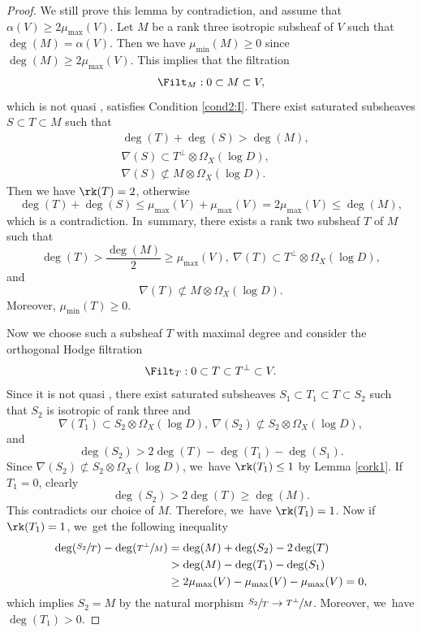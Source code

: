 \begin{proof}
We still prove this lemma by contradiction, and assume that $\alpha(V)\geq2\mu_{\max}(V)$. Let $M$ be a rank three isotropic subsheaf of $V$ such that $\deg(M)=\alpha(V)$. Then we have $\mu_{\min}(M)\geq0$ since $\deg(M)\geq 2\mu_{\max}(V)$. This implies that the filtration
\[
\Filt_{M}:0\subset M\subset V,
\]
which is not quasi \grsemistable, satisfies Condition \eqref{cond2:I}. There exist saturated subsheaves $S\subset T\subset M$ such that
\begin{align*}
& \deg(T)+\deg(S)>\deg(M), \\
& \nabla(S)\subset T^\perp\otimes\Omega_X(\log D), \\
& \nabla(S)\not\subset M\otimes\Omega_X(\log D).
\end{align*}
Then we have $\rk(T)=2$, otherwise
\[
\deg(T)+\deg(S)\leq \mu_{\max}(V)+\mu_{\max}(V)=2\mu_{\max}(V)\leq \deg(M),
\]
which is a contradiction. In~summary, there exists a rank two subsheaf $T$ of $M$ such that
\[
\deg(T)>\frac{\deg(M)}{2}\geq \mu_{\max}(V),\ \nabla(T)\subset T^\perp\otimes\Omega_X(\log D),
\]
and
\[
\nabla(T)\not\subset M\otimes\Omega_X(\log D).
\]
Moreover, $\mu_{\min}(T)\geq 0$.

Now we choose such a subsheaf $T$ with maximal degree and consider the orthogonal Hodge filtration
\[
\Filt_{T}:0\subset T\subset T^\perp\subset V.
\]
Since it is not quasi \grsemistable, there exist saturated subsheaves $S_1\subset T_1\subset T\subset S_2$ such that $S_2$ is isotropic of rank three and
\[
\nabla(T_1)\subset S_2\otimes\Omega_X(\log D),\ \nabla(S_2)\not\subset S_2\otimes\Omega_X(\log D),
\]
and
\[
\deg(S_2)>2\deg(T)-\deg(T_1)-\deg(S_1).
\]
Since $\nabla(S_2)\not\subset S_2\otimes\Omega_X(\log D)$, we~have $\rk(T_1)\leq1$ by Lemma \ref{cork1}. If $T_1=0$, clearly
\[
\deg(S_2)>2\deg(T)\geq \deg(M).
\]
This contradicts our choice of $M$. Therefore, we~have $\rk(T_1)=1$. Now if $\rk(T_1)=1$, we~get the following inequality
\begin{equation*}
\begin{split}
\deg(\sfrac{S_2}{T})-\deg(\sfrac{T^\perp}{M})&=\deg(M)+\deg(S_2)-2\deg(T)\\
&>\deg(M)-\deg(T_1)-\deg(S_1)\\
&\ge2\mu_{\max}(V)-\mu_{\max}(V)-\mu_{\max}(V)=0,
\end{split}
\end{equation*}
which implies $S_2=M$ by the natural morphism $\sfrac{S_2}{T}\to \sfrac{T^\perp}{M}$. Moreover, we~have $\deg(T_1)>0$.


\end{proof}
